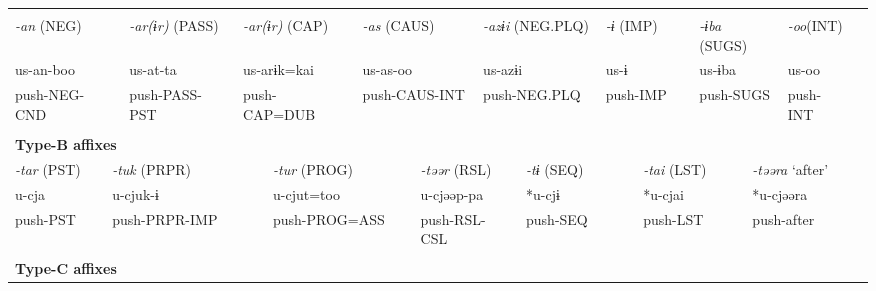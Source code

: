 \tabletail{}
\tablelasttail{}
\begin{tabularx}{\textwidth}{XXm{}XXXXXXXXXXXXXXXXXXXX}
\lsptoprule
\multicolumn{23}{X}{{\bfseries Type-A affixes}}\\
\multicolumn{3}{X}{{ \textit{{}-an} (NEG)}} & \multicolumn{3}{X}{{ \textit{{}-ar(ɨr)} (PASS)}} & \multicolumn{4}{X}{{ \textit{{}-ar(ɨr)} (CAP)}} & \multicolumn{4}{X}{{ \textit{{}-as} (CAUS)}} & \multicolumn{3}{X}{{ \textit{{}-azɨi} (NEG.PLQ)}} & \multicolumn{2}{X}{{ \textit{{}-ɨ} (IMP)}} & \multicolumn{2}{X}{{ \textit{{}-ɨba} (SUGS)}} & { \textit{{}-oo}(INT)} & \\
\multicolumn{3}{X}{{ us-an-boo}} & \multicolumn{3}{X}{{ us-at-ta}} & \multicolumn{4}{X}{{ us-arɨk=kai}} & \multicolumn{4}{X}{{ us-as-oo}} & \multicolumn{3}{X}{{ us-azɨi}} & \multicolumn{2}{X}{{ us-ɨ}} & \multicolumn{2}{X}{{ us-ɨba}} & { us-oo} & \\
\multicolumn{3}{X}{push-NEG-CND} & \multicolumn{3}{X}{push-PASS-PST} & \multicolumn{4}{X}{push-CAP=DUB} & \multicolumn{4}{X}{push-CAUS-INT} & \multicolumn{3}{X}{push-NEG.PLQ} & \multicolumn{2}{X}{push-IMP} & \multicolumn{2}{X}{push-SUGS} & push-INT & \\
\multicolumn{23}{X}{}\\
\multicolumn{23}{X}{{\bfseries Type-B affixes}}\\
\multicolumn{2}{X}{{ \textit{{}-tar} (PST)}} & \multicolumn{6}{X}{{ \textit{{}-tuk} (PRPR)}} & \multicolumn{3}{X}{{ \textit{{}-tur} (PROG)}} & \multicolumn{4}{X}{{ \textit{{}-təər} (RSL)}} & \multicolumn{3}{X}{{ \textit{{}-tɨ} (SEQ)}} & \multicolumn{2}{X}{{ \textit{{}-tai} (LST)}} & \multicolumn{3}{X}{{ \textit{{}-təəra} ‘after’}}\\
\multicolumn{2}{X}{{ u-cja}} & \multicolumn{6}{X}{{ u-cjuk-ɨ}} & \multicolumn{3}{X}{{ u-cjut=too}} & \multicolumn{4}{X}{{ u-cjəəp-pa}} & \multicolumn{3}{X}{{ *u-cjɨ}} & \multicolumn{2}{X}{{ *u-cjai}} & \multicolumn{3}{X}{{ *u-cjəəra}}\\
\multicolumn{2}{X}{push-PST} & \multicolumn{6}{X}{push-PRPR-IMP} & \multicolumn{3}{X}{push-PROG=ASS} & \multicolumn{4}{X}{push-RSL-CSL} & \multicolumn{3}{X}{push-SEQ} & \multicolumn{2}{X}{push-LST} & \multicolumn{3}{X}{{ push-after}}\\
\multicolumn{2}{X}{} & \multicolumn{6}{X}{} & \multicolumn{3}{X}{} & \multicolumn{4}{X}{} & \multicolumn{3}{X}{} & \multicolumn{2}{X}{} & \multicolumn{3}{X}{}\\
\multicolumn{23}{X}{{\bfseries Type-C affixes}}\\

\end{tabularx}
